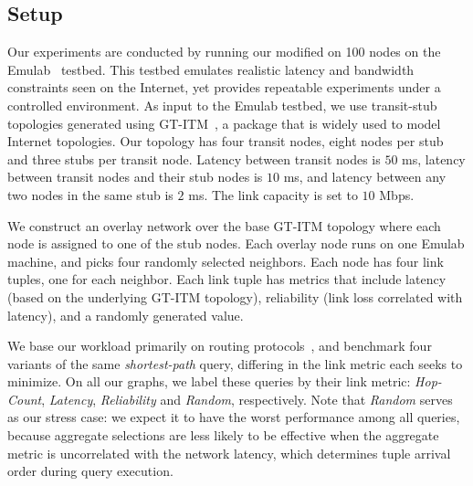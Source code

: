
\subsection{Setup}

Our experiments are conducted by running our modified \Pitu on 100 nodes
on the Emulab~\cite{emulab}
testbed. This testbed emulates realistic latency and bandwidth constraints seen on the Internet,
  yet provides repeatable experiments under a controlled environment. As input to the Emulab testbed, we use transit-stub
topologies generated using GT-ITM~\cite{gtitm}, a package that is widely used to model
Internet topologies. Our topology has four transit nodes, eight nodes
per stub and three stubs per transit node. Latency between transit nodes
  is $50$ ms, latency between transit nodes and their stub nodes is $10$
ms, and latency between any two nodes in the same stub is $2$
ms. The link capacity is set to $10$ Mbps.

We construct an overlay network over the base GT-ITM topology where
each node is assigned to one of the stub nodes. Each overlay node runs
\Sys on one Emulab machine, and picks four randomly selected
neighbors. Each node has four link tuples, one for each neighbor. Each
link tuple has metrics that include latency (based on the underlying GT-ITM
topology), reliability (link loss correlated with latency),
and a randomly generated value.  

We base our workload primarily on routing
protocols~\cite{declareRoute}, and benchmark four variants of the
same {\em shortest-path} query, differing in the link metric each
seeks to minimize. On all our graphs, we label these queries by their
link metric: {\em Hop-Count}, {\em Latency}, {\em Reliability} and
{\em Random}, respectively. Note that {\em Random} serves as our
stress case: we expect it to have the worst performance among all
queries, because aggregate selections are less
likely to be effective when the aggregate metric is uncorrelated with
the network latency, which determines tuple arrival order during query
execution.






